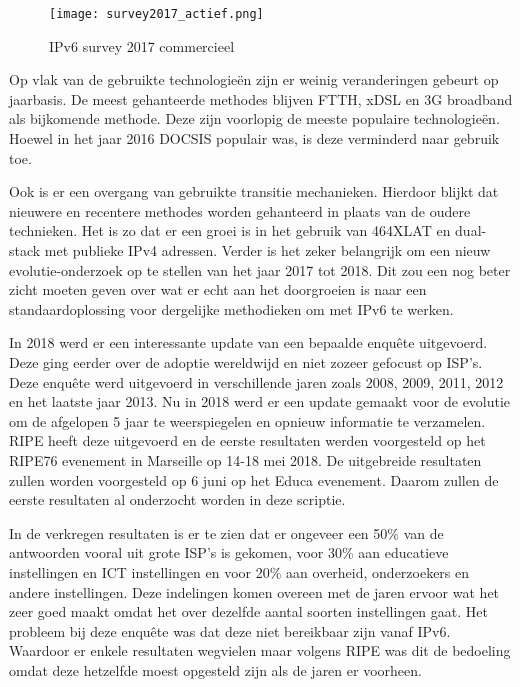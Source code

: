 \begin{figure}
\centering
\texttt{[image: survey2017\_actief.png]}
\caption{IPv6 survey 2017 commercieel \autocite{Martinez2017}}
\end{figure}

Op vlak van de gebruikte technologieën zijn er weinig veranderingen gebeurt op jaarbasis. De meest gehanteerde methodes blijven FTTH, xDSL en 3G broadband als bijkomende methode. Deze zijn voorlopig de meeste populaire technologieën. Hoewel in het jaar 2016 DOCSIS populair was, is deze verminderd naar gebruik toe.

Ook is er een overgang van gebruikte transitie mechanieken. Hierdoor blijkt dat nieuwere en recentere methodes worden gehanteerd in plaats van de oudere technieken. Het is zo dat er een groei is in het gebruik van 464XLAT en dual-stack met publieke IPv4 adressen. Verder is het zeker belangrijk om een nieuw evolutie-onderzoek op te stellen van het jaar 2017 tot 2018. Dit zou een nog beter zicht moeten geven over wat er echt aan het doorgroeien is naar een standaardoplossing voor dergelijke methodieken om met IPv6 te werken.

In 2018 werd er een interessante update van een bepaalde enquête uitgevoerd. Deze ging eerder over de adoptie wereldwijd en niet zozeer gefocust op ISP’s. Deze enquête werd uitgevoerd in verschillende jaren zoals 2008, 2009, 2011, 2012 en het laatste jaar 2013. Nu in 2018 werd er een update gemaakt voor de evolutie om de afgelopen 5 jaar te weerspiegelen en opnieuw informatie te verzamelen. RIPE heeft deze uitgevoerd en de eerste resultaten werden voorgesteld op het RIPE76 evenement in Marseille op 14-18 mei 2018. De uitgebreide resultaten zullen worden voorgesteld op 6 juni op het Educa evenement. Daarom zullen de eerste resultaten al onderzocht worden in deze scriptie.

In de verkregen resultaten is er te zien dat er ongeveer een 50\% van de antwoorden vooral uit grote ISP’s is gekomen, voor 30\% aan educatieve instellingen en ICT instellingen en voor 20\% aan overheid, onderzoekers en andere instellingen. Deze indelingen komen overeen met de jaren ervoor wat het zeer goed maakt omdat het over dezelfde aantal soorten instellingen gaat. Het probleem bij deze enquête was dat deze niet bereikbaar zijn vanaf IPv6. Waardoor er enkele resultaten wegvielen maar volgens RIPE was dit de bedoeling omdat deze hetzelfde moest opgesteld zijn als de jaren er voorheen.

